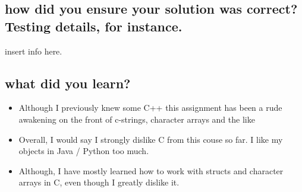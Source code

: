 \documentclass[letterpaper,10pt,titlepage]{article}
\begin{document}
\subsection{how did you ensure your solution was correct? Testing details, for instance.}

insert info here.

\subsection{what did you learn?}

\begin{itemize}
\item Although I previously knew some C++ this assignment has been a rude awakening on the front of c-strings, character arrays and the like
\item Overall, I would say I strongly dislike C from this couse so far.  I like my objects in Java / Python too much.
\item Although, I have mostly learned how to work with structs and character arrays in C, even though I greatly dislike it.
\end{itemize}
\end{document}

